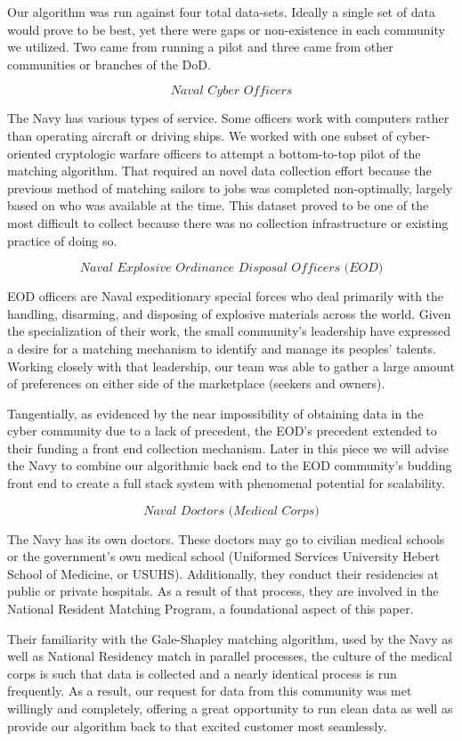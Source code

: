 Our algorithm was run against four total data-sets. Ideally a single set of data would prove to be best, yet there were gaps or non-existence in each community we utilized. Two came from running a pilot and three came from other communities or branches of the DoD. 

\[\textit{Naval Cyber Officers}\]

The Navy has various types of service.  Some officers work with computers rather than operating aircraft or driving ships. We worked with one subset of cyber-oriented cryptologic warfare officers to attempt a bottom-to-top pilot of the matching algorithm.  That required an novel data collection effort because the previous method of matching sailors to jobs was completed non-optimally, largely based on who was available at the time. This dataset proved to be one of the most difficult to collect because there was no collection infrastructure or existing practice of doing so. 

\[\textit{Naval Explosive Ordinance Disposal Officers (EOD)}\]

EOD officers are Naval expeditionary special forces who deal primarily with the handling, disarming, and disposing of explosive materials across the world. Given the specialization of their work, the small community’s leadership have expressed a desire for a matching mechanism to identify and manage its peoples’ talents.  Working closely with that leadership, our team was able to gather a large amount of preferences on either side of the marketplace (seekers and owners).  

Tangentially, as evidenced by the near impossibility of obtaining data in the cyber community due to a lack of precedent, the EOD’s precedent extended to their funding a front end collection mechanism.  Later in this piece we will advise the Navy to combine our algorithmic back end to the EOD community’s budding front end to create a full stack system with phenomenal potential for scalability.  

\[\textit{Naval Doctors (Medical Corps)}\]

The Navy has its own doctors. These doctors may go to civilian medical schools or the government’s own medical school (Uniformed Services University Hebert School of Medicine, or USUHS).  Additionally, they conduct their residencies at public or private hospitals.  As a result of that process, they are involved in the National Resident Matching Program, a foundational aspect of this paper. 

Their familiarity with the Gale-Shapley matching algorithm, used by the Navy as well as National Residency match in parallel processes, the culture of the medical corps is such that data is collected and a nearly identical process is run frequently.  As a result, our request for data from this community was met willingly and completely, offering a great opportunity to run clean data as well as provide our algorithm back to that excited customer most seamlessly. 


